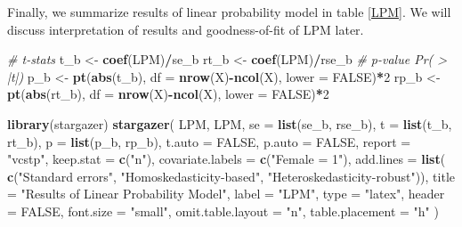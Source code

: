 \documentclass[
  12pt,
]{article}
\newenvironment{Shaded}{\begin{snugshade}}{\end{snugshade}}
\newcommand{\CommentTok}[1]{\textcolor[rgb]{0.56,0.35,0.01}{\textit{#1}}}
\newcommand{\DataTypeTok}[1]{\textcolor[rgb]{0.13,0.29,0.53}{#1}}
\newcommand{\DecValTok}[1]{\textcolor[rgb]{0.00,0.00,0.81}{#1}}
\newcommand{\KeywordTok}[1]{\textcolor[rgb]{0.13,0.29,0.53}{\textbf{#1}}}
\newcommand{\NormalTok}[1]{#1}
\newcommand{\OperatorTok}[1]{\textcolor[rgb]{0.81,0.36,0.00}{\textbf{#1}}}
\newcommand{\OtherTok}[1]{\textcolor[rgb]{0.56,0.35,0.01}{#1}}
\newcommand{\StringTok}[1]{\textcolor[rgb]{0.31,0.60,0.02}{#1}}
\begin{document}
Finally, we summarize results of linear probability model in table
\ref{LPM}. We will discuss interpretation of results and goodness-of-fit
of LPM later.

\begin{Shaded}
\begin{Highlighting}[]
\CommentTok{\# t{-}stats}
\NormalTok{t\_b \textless{}{-}}\StringTok{ }\KeywordTok{coef}\NormalTok{(LPM)}\OperatorTok{/}\NormalTok{se\_b }
\NormalTok{rt\_b \textless{}{-}}\StringTok{ }\KeywordTok{coef}\NormalTok{(LPM)}\OperatorTok{/}\NormalTok{rse\_b}
\CommentTok{\# p{-}value Pr( \textgreater{} |t|)}
\NormalTok{p\_b \textless{}{-}}\StringTok{ }\KeywordTok{pt}\NormalTok{(}\KeywordTok{abs}\NormalTok{(t\_b), }\DataTypeTok{df =} \KeywordTok{nrow}\NormalTok{(X)}\OperatorTok{{-}}\KeywordTok{ncol}\NormalTok{(X), }\DataTypeTok{lower =} \OtherTok{FALSE}\NormalTok{)}\OperatorTok{*}\DecValTok{2}
\NormalTok{rp\_b \textless{}{-}}\StringTok{ }\KeywordTok{pt}\NormalTok{(}\KeywordTok{abs}\NormalTok{(rt\_b), }\DataTypeTok{df =} \KeywordTok{nrow}\NormalTok{(X)}\OperatorTok{{-}}\KeywordTok{ncol}\NormalTok{(X), }\DataTypeTok{lower =} \OtherTok{FALSE}\NormalTok{)}\OperatorTok{*}\DecValTok{2}

\KeywordTok{library}\NormalTok{(stargazer)}
\KeywordTok{stargazer}\NormalTok{(}
\NormalTok{  LPM, LPM,}
  \DataTypeTok{se =} \KeywordTok{list}\NormalTok{(se\_b, rse\_b), }\DataTypeTok{t =} \KeywordTok{list}\NormalTok{(t\_b, rt\_b), }\DataTypeTok{p =} \KeywordTok{list}\NormalTok{(p\_b, rp\_b),}
  \DataTypeTok{t.auto =} \OtherTok{FALSE}\NormalTok{, }\DataTypeTok{p.auto =} \OtherTok{FALSE}\NormalTok{,}
  \DataTypeTok{report =} \StringTok{"vcstp"}\NormalTok{, }\DataTypeTok{keep.stat =} \KeywordTok{c}\NormalTok{(}\StringTok{"n"}\NormalTok{),}
  \DataTypeTok{covariate.labels =} \KeywordTok{c}\NormalTok{(}\StringTok{"Female = 1"}\NormalTok{),}
  \DataTypeTok{add.lines =} \KeywordTok{list}\NormalTok{(}
    \KeywordTok{c}\NormalTok{(}\StringTok{"Standard errors"}\NormalTok{, }\StringTok{"Homoskedasticity{-}based"}\NormalTok{, }\StringTok{"Heteroskedasticity{-}robust"}\NormalTok{)),}
  \DataTypeTok{title =} \StringTok{"Results of Linear Probability Model"}\NormalTok{, }\DataTypeTok{label =} \StringTok{"LPM"}\NormalTok{,}
  \DataTypeTok{type =} \StringTok{"latex"}\NormalTok{, }\DataTypeTok{header =} \OtherTok{FALSE}\NormalTok{, }\DataTypeTok{font.size =} \StringTok{"small"}\NormalTok{,}
  \DataTypeTok{omit.table.layout =} \StringTok{"n"}\NormalTok{, }\DataTypeTok{table.placement =} \StringTok{"h"}
\NormalTok{)}
\end{Highlighting}
\end{Shaded}
\end{document}

